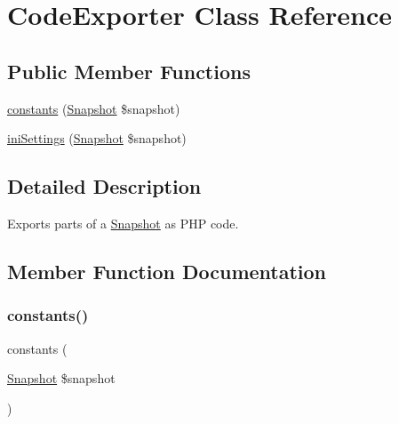 \hypertarget{class_sebastian_bergmann_1_1_global_state_1_1_code_exporter}{}\section{Code\+Exporter Class Reference}
\label{class_sebastian_bergmann_1_1_global_state_1_1_code_exporter}
\subsection*{Public Member Functions}
\begin{DoxyCompactItemize}
\item 
\mbox{\hyperlink{class_sebastian_bergmann_1_1_global_state_1_1_code_exporter_afec08f780464f12decd962cf289a8809}{constants}} (\mbox{\hyperlink{class_sebastian_bergmann_1_1_global_state_1_1_snapshot}{Snapshot}} \$snapshot)
\item 
\mbox{\hyperlink{class_sebastian_bergmann_1_1_global_state_1_1_code_exporter_a42d2489e1d9a4191d9c5ba3d360f4eda}{ini\+Settings}} (\mbox{\hyperlink{class_sebastian_bergmann_1_1_global_state_1_1_snapshot}{Snapshot}} \$snapshot)
\end{DoxyCompactItemize}


\subsection{Detailed Description}
Exports parts of a \mbox{\hyperlink{class_sebastian_bergmann_1_1_global_state_1_1_snapshot}{Snapshot}} as P\+HP code. 

\subsection{Member Function Documentation}
\mbox{\label{class_sebastian_bergmann_1_1_global_state_1_1_code_exporter_afec08f780464f12decd962cf289a8809}} 
\subsubsection{\texorpdfstring{constants()}{constants()}}
{\footnotesize\ttfamily constants (\begin{DoxyParamCaption}\item[{\mbox{\hyperlink{class_sebastian_bergmann_1_1_global_state_1_1_snapshot}{Snapshot}}}]{\$snapshot }\end{DoxyParamCaption})}


